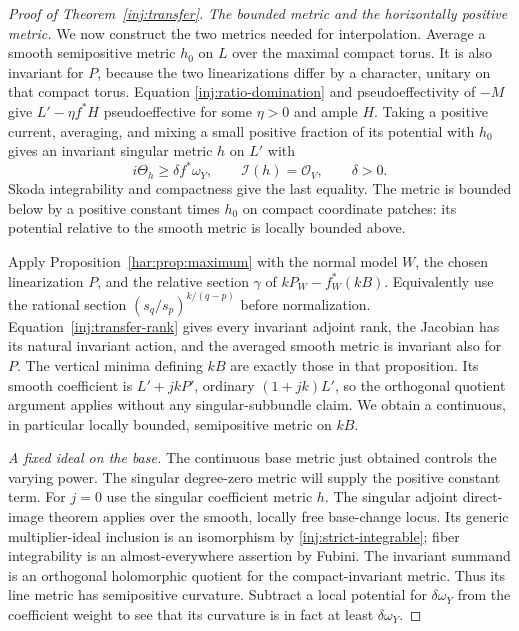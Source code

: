 \begin{proof}[Proof of Theorem~\ref{inj:transfer}]
\smallskip\noindent\textit{The bounded metric and the horizontally positive metric.} We now construct the two metrics needed for interpolation. Average a smooth semipositive metric $h_0$ on $L$ over the maximal
compact torus.  It is also invariant for $P$, because the two
linearizations differ by a character, unitary on that compact torus.
Equation \eqref{inj:ratio-domination} and pseudoeffectivity of $-M$
give $L'-\eta f^*H$ pseudoeffective for some $\eta>0$ and ample
$H$.  Taking a positive current, averaging, and mixing a small
positive fraction of its potential with $h_0$ gives an invariant
singular metric $h$ on $L'$ with
\begin{equation}\label{inj:strict-integrable}
 i\Theta_h\ge\delta f^*\omega_Y,
 \qquad \mathcal I(h)=\mathcal O_V,
 \qquad\delta>0.
\end{equation}
Skoda integrability and compactness give the last equality.  The
metric is bounded below by a positive constant times $h_0$ on
compact coordinate patches: its potential relative to the smooth
metric is locally bounded above.

Apply Proposition~\ref{har:prop:maximum} with the normal model $W$, the chosen linearization $P$, and the relative section $\gamma$ of $kP_W-f_W^*(kB)$. Equivalently use the rational section $(s_q/s_p)^{k/(q-p)}$ before normalization. Equation~\eqref{inj:transfer-rank} gives every invariant adjoint rank, the Jacobian has its natural invariant action, and the averaged smooth metric is invariant also for $P$. The vertical minima defining $kB$ are exactly those in that proposition. Its smooth coefficient is $L'+jkP'$, ordinary $(1+jk)L'$, so the orthogonal quotient argument applies without any singular-subbundle claim. We obtain a continuous, in particular locally bounded, semipositive metric on $kB$.

\smallskip\noindent\textit{A fixed ideal on the base.} The continuous base metric just obtained controls the varying power. The singular degree-zero metric will supply the positive constant term.
For $j=0$ use the singular coefficient metric $h$.
The singular adjoint direct-image theorem
\cite[Setup 3.2.1 and Theorem 3.3.4]{PT2018} applies over the
smooth, locally free base-change locus.  Its generic multiplier-ideal
inclusion is an isomorphism by \eqref{inj:strict-integrable}; fiber
integrability is an almost-everywhere assertion by Fubini.
The invariant summand is an orthogonal holomorphic quotient for
the compact-invariant metric.  Thus its line metric has
semipositive curvature.  Subtract a local potential for
$\delta\omega_Y$ from the coefficient weight to see that its
curvature is in fact at least $\delta\omega_Y$.


\end{proof}
